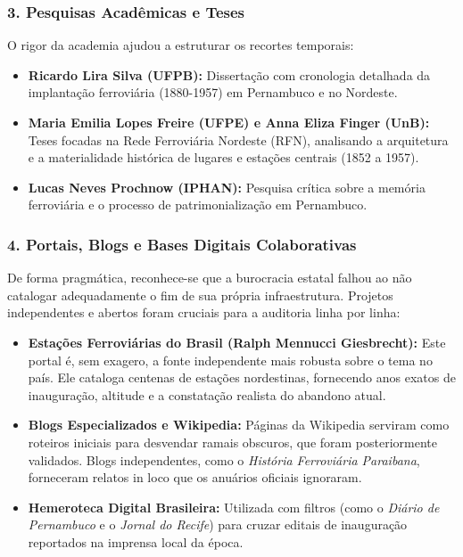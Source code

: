 \documentclass[11pt, a4paper]{article}
\begin{document}
\subsubsection*{3. Pesquisas Acadêmicas e Teses}
O rigor da academia ajudou a estruturar os recortes temporais:
\begin{itemize}
    \item \textbf{Ricardo Lira Silva (UFPB):} Dissertação com cronologia detalhada da implantação ferroviária (1880-1957) em Pernambuco e no Nordeste.
    \item \textbf{Maria Emilia Lopes Freire (UFPE) e Anna Eliza Finger (UnB):} Teses focadas na Rede Ferroviária Nordeste (RFN), analisando a arquitetura e a materialidade histórica de lugares e estações centrais (1852 a 1957).
    \item \textbf{Lucas Neves Prochnow (IPHAN):} Pesquisa crítica sobre a memória ferroviária e o processo de patrimonialização em Pernambuco.
\end{itemize}

\subsubsection*{4. Portais, Blogs e Bases Digitais Colaborativas}
De forma pragmática, reconhece-se que a burocracia estatal falhou ao não catalogar adequadamente o fim de sua própria infraestrutura. Projetos independentes e abertos foram cruciais para a auditoria linha por linha:
\begin{itemize}
    \item \textbf{Estações Ferroviárias do Brasil (Ralph Mennucci Giesbrecht):} Este portal é, sem exagero, a fonte independente mais robusta sobre o tema no país. Ele cataloga centenas de estações nordestinas, fornecendo anos exatos de inauguração, altitude e a constatação realista do abandono atual.
    \item \textbf{Blogs Especializados e Wikipedia:} Páginas da Wikipedia serviram como roteiros iniciais para desvendar ramais obscuros, que foram posteriormente validados. Blogs independentes, como o \textit{História Ferroviária Paraibana}, forneceram relatos in loco que os anuários oficiais ignoraram.
    \item \textbf{Hemeroteca Digital Brasileira:} Utilizada com filtros (como o \textit{Diário de Pernambuco} e o \textit{Jornal do Recife}) para cruzar editais de inauguração reportados na imprensa local da época.
\end{itemize}
\end{document}
